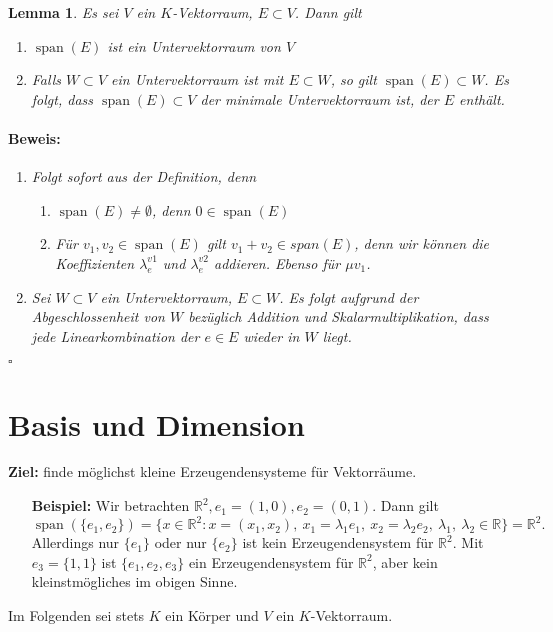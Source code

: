 \documentclass{report}
\newcommand{\lb}{\lambda}
\newcommand{\R}{\mathbb{R}}
\DeclareMathOperator{\Span}{span}
\theoremstyle{customrem}
\theoremstyle{customdef}
\newtheorem{lemma}[definition]{Lemma}
\renewenvironment{proof}{\vspace{-.75cm}\paragraph{Beweis: }}{\vspace{-.5cm}\hfill$\square$}
\begin{document}
	\begin{lemma}
		Es sei $V$ ein $K$-Vektorraum, $E \subset V$. Dann gilt
		\begin{enumerate}
			\item $\Span(E)$ ist ein Untervektorraum von $V$
			\item Falls $W \subset V$ ein Untervektorraum ist mit $E \subset W$, so gilt $\Span(E) \subset W$. Es folgt, dass $\Span(E) \subset V$ der minimale Untervektorraum ist, der $E$ enthält.
		\end{enumerate}
		\vspace{.2cm}
		\begin{proof}
			\begin{enumerate}
				\item Folgt sofort aus der Definition, denn 
				\begin{enumerate}
					\item $\Span(E) \neq \emptyset$, denn $0 \in \Span(E)$
					\item Für $v_1, v_2 \in \Span(E)$ gilt $v_1 + v_2 \in span(E)$, denn wir können die Koeffizienten $\lb_e^{v1}$ und $\lb_e^{v2}$ addieren. Ebenso für $\mu v_1$.
				\end{enumerate}
				\item Sei $W \subset V$ ein Untervektorraum, $E \subset W$. Es folgt aufgrund der Abgeschlossenheit von $W$ bezüglich Addition und Skalarmultiplikation, dass jede Linearkombination der $e \in E$ wieder in $W$ liegt.
			\end{enumerate}
		\end{proof}
	\end{lemma}
	
\section{Basis und Dimension}
	\hspace{-.25cm}\textbf{Ziel:} finde möglichst kleine Erzeugendensysteme für Vektorräume.
	\begin{enumerate}[leftmargin=1.4cm]
		\item[\textbf{Beispiel:}]Wir betrachten $\R^2, e_1=(1, 0), e_2 = (0,1)$. Dann gilt $$\Span(\{e_1, e_2\})
		= \{x \in \R^2 : x = (x_1, x_2),\ x_1 = \lb_1 e_1,\ x_2 = \lb_2 e_2,\ \lb_1,\ \lb_2 \in \R\} = \R^2.$$ 
		Allerdings nur $\{e_1\}$ oder nur $\{e_2\}$ ist kein Erzeugendensystem für $\R^2$. Mit $e_3 = \{1, 1\}$ ist $\{e_1, e_2, e_3\}$ ein Erzeugendensystem für $\R^2$, aber kein kleinstmögliches im obigen Sinne.
	\end{enumerate}
	\hspace{-.25cm}Im Folgenden sei stets $K$ ein Körper und $V$ ein $K$-Vektorraum.
	
\end{document}

